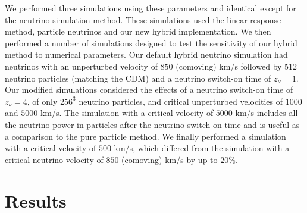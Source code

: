 \documentclass[useAMS, usenatbib]{mnras}
\begin{document}
We performed three simulations using these parameters and identical except for the neutrino simulation method. These simulations used the linear response method, particle neutrinos and our new hybrid implementation. We then performed a number of simulations designed to test the sensitivity of our hybrid method to numerical parameters. Our default hybrid neutrino simulation had neutrinos with an unperturbed velocity of $850$ (comoving) km/s followed by $512$ neutrino particles (matching the CDM) and a neutrino switch-on time of $z_\nu = 1$. Our modified simulations considered the effects of a neutrino switch-on time of $z_\nu = 4$, of only $256^3$ neutrino particles, and critical unperturbed velocities of $1000$ and $5000$ km/s. The simulation with a critical velocity of $5000$ km/s includes all the neutrino power in particles after the neutrino switch-on time and is useful as a comparison to the pure particle method. We finally performed a simulation with a critical velocity of $500$ km/s, which differed from the simulation with a critical neutrino velocity of $850$ (comoving) km/s by up to $20\%$.

\section{Results}
\label{sec:results}
\end{document}
